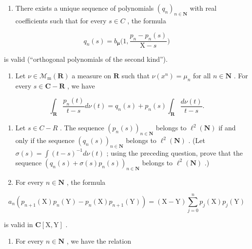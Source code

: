 \begin{enumerate}
\def\labelenumi{\alph{enumi})}
\tightlist
\item
  There exists a unique sequence of polynomials \((q_{n})_{n\in\mathbf{N}}\) with real coefficients such that for every \(s\in C\) , the formula
\end{enumerate}

\[
q _ {n} (s) = b _ {\pmb {\mu}} \Big (1, \frac {p _ {n} - p _ {n} (s)}{\mathrm{X} - s} \Big)
\]

is valid (“orthogonal polynomials of the second kind”).

\begin{enumerate}
\def\labelenumi{\alph{enumi})}
\setcounter{enumi}{1}
\tightlist
\item
  Let \(\nu \in \mathcal{M}_{\mathrm{m}}(\mathbf{R})\) a measure on \(\mathbf{R}\) such that \(\nu(x^n) = \mu_n\) for all \(n \in \mathbf{N}\) . For every \(s \in \mathbf{C} - \mathbf{R}\) , we have
\end{enumerate}

\[
\int_ {\mathbf {R}} \frac {p _ {n} (t)}{t - s} d \nu (t) = q _ {n} (s) + p _ {n} (s) \int_ {\mathbf {R}} \frac {d \nu (t)}{t - s}.
\]

\begin{enumerate}
\def\labelenumi{\alph{enumi})}
\setcounter{enumi}{2}
\item
  Let \(s \in C-R\) . The sequence \((p_{n}(s))_{n \in \mathbf{N}}\) belongs to \(\ell^{2}(\mathbf{N})\) if and only if the sequence \((q_{n}(s))_{n \in \mathbf{N}}\) belongs to \(\ell^{2}(\mathbf{N})\) . (Let \(\sigma(s) = \int(t-s)^{-1} d\nu(t)\) ; using the preceding question, prove that the sequence \((q_{n}(s) + \sigma(s)p_{n}(s))_{n \in \mathbf{N}}\) belongs to \(\ell^{2}(\mathbf{N})\) .)
\item
  For every \(n \in \mathbf{N}\) , the formula
\end{enumerate}

\[
a _ {n} (p _ {n + 1} (\mathrm{X}) p _ {n} (\mathrm{Y}) - p _ {n} (\mathrm{X}) p _ {n + 1} (\mathrm{Y})) = (\mathrm{X} - \mathrm{Y}) \sum_ {j = 0} ^ {n} p _ {j} (\mathrm{X}) p _ {j} (\mathrm{Y})
\]

is valid in \(\mathbf{C}[\mathrm{X},\mathrm{Y}]\) .

\begin{enumerate}
\def\labelenumi{\alph{enumi})}
\setcounter{enumi}{4}
\tightlist
\item
  For every \(n \in \mathbf{N}\) , we have the relation
\end{enumerate}

